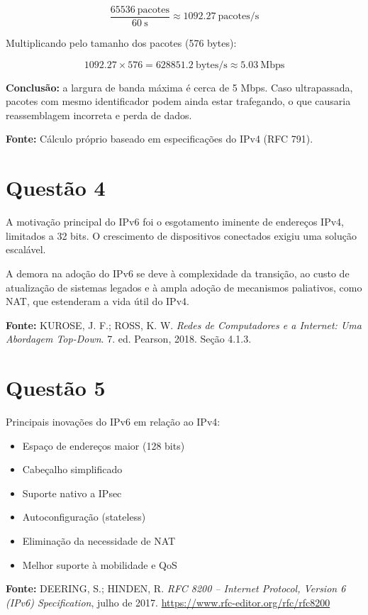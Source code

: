 \documentclass[12pt]{article}
\begin{document}
\[
\frac{65536~\text{pacotes}}{60~\text{s}} \approx 1092.27~\text{pacotes/s}
\]

Multiplicando pelo tamanho dos pacotes (576 bytes):

\[
1092.27 \times 576 = 628851.2~\text{bytes/s} \approx 5.03~\text{Mbps}
\]

\textbf{Conclusão:} a largura de banda máxima é cerca de 5 Mbps. Caso ultrapassada, pacotes com mesmo identificador podem ainda estar trafegando, o que causaria reassemblagem incorreta e perda de dados.

\textbf{Fonte:} Cálculo próprio baseado em especificações do IPv4 (RFC 791).

\section*{Questão 4}

A motivação principal do IPv6 foi o esgotamento iminente de endereços IPv4, limitados a 32 bits. O crescimento de dispositivos conectados exigiu uma solução escalável.

A demora na adoção do IPv6 se deve à complexidade da transição, ao custo de atualização de sistemas legados e à ampla adoção de mecanismos paliativos, como NAT, que estenderam a vida útil do IPv4.

\textbf{Fonte:} KUROSE, J. F.; ROSS, K. W. \textit{Redes de Computadores e a Internet: Uma Abordagem Top-Down}. 7. ed. Pearson, 2018. Seção 4.1.3.

\section*{Questão 5}

Principais inovações do IPv6 em relação ao IPv4:

\begin{itemize}
    \item Espaço de endereços maior (128 bits)
    \item Cabeçalho simplificado
    \item Suporte nativo a IPsec
    \item Autoconfiguração (stateless)
    \item Eliminação da necessidade de NAT
    \item Melhor suporte à mobilidade e QoS
\end{itemize}

\textbf{Fonte:} DEERING, S.; HINDEN, R. \textit{RFC 8200 – Internet Protocol, Version 6 (IPv6) Specification}, julho de 2017. \url{https://www.rfc-editor.org/rfc/rfc8200}
\end{document}
